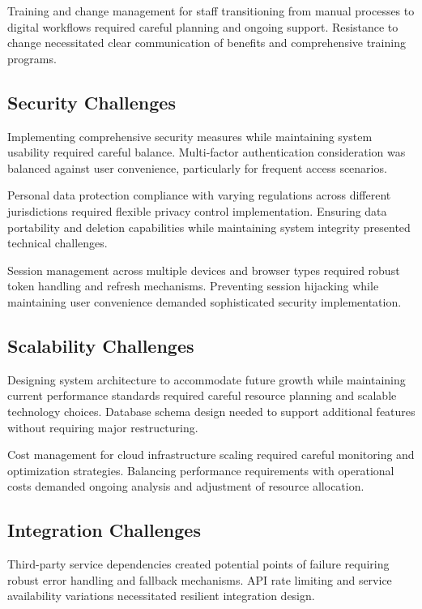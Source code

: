 \documentclass[12pt,a4paper]{report}
\begin{document}
Training and change management for staff transitioning from manual processes to digital workflows required careful planning and ongoing support. Resistance to change necessitated clear communication of benefits and comprehensive training programs.

\subsection{Security Challenges}

Implementing comprehensive security measures while maintaining system usability required careful balance. Multi-factor authentication consideration was balanced against user convenience, particularly for frequent access scenarios.

Personal data protection compliance with varying regulations across different jurisdictions required flexible privacy control implementation. Ensuring data portability and deletion capabilities while maintaining system integrity presented technical challenges.

Session management across multiple devices and browser types required robust token handling and refresh mechanisms. Preventing session hijacking while maintaining user convenience demanded sophisticated security implementation.

\subsection{Scalability Challenges}

Designing system architecture to accommodate future growth while maintaining current performance standards required careful resource planning and scalable technology choices. Database schema design needed to support additional features without requiring major restructuring.

Cost management for cloud infrastructure scaling required careful monitoring and optimization strategies. Balancing performance requirements with operational costs demanded ongoing analysis and adjustment of resource allocation.

\subsection{Integration Challenges}

Third-party service dependencies created potential points of failure requiring robust error handling and fallback mechanisms. API rate limiting and service availability variations necessitated resilient integration design.
\end{document}
